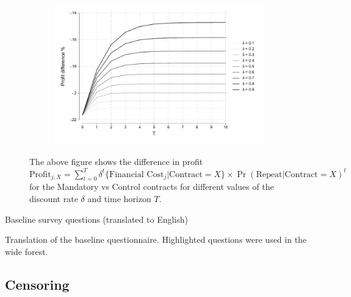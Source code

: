 \begin{appendix}
\begin{figure}[H]
    \caption{Profit difference Mandatory vs Control arm.}
    \begin{center}
    \begin{subfigure}{0.65\textwidth}
        \centering
        \includegraphics[width=\textwidth]{Figuras/profit_mandatory_control.pdf}
    \end{subfigure}
    \end{center}
\footnotesize{The above figure shows the difference in profit $\text{Profit}_{j,X}  = \sum_{t=0}^T\delta^t\{\text{Financial Cost}_j | \text{Contract}=X\}\times\Pr(\text{Repeat} | \text{Contract}=X)^t$ for the Mandatory vs Control contracts for different values of the discount rate $\delta$ and time horizon $T$.  }
    \label{profit_mandatory_control}
\end{figure}

\newpage

\begin{table}[!h]
\caption{Baseline survey questions (translated to English)}
\label{baseline_survey}
\begin{center}
\scriptsize{}
\end{center}
\scriptsize{
Translation of the baseline questionnaire. Highlighted questions were used in the wide forest.}
\end{table}

\newpage




\subsection{Censoring} \label{App_censoring}



\end{appendix}
